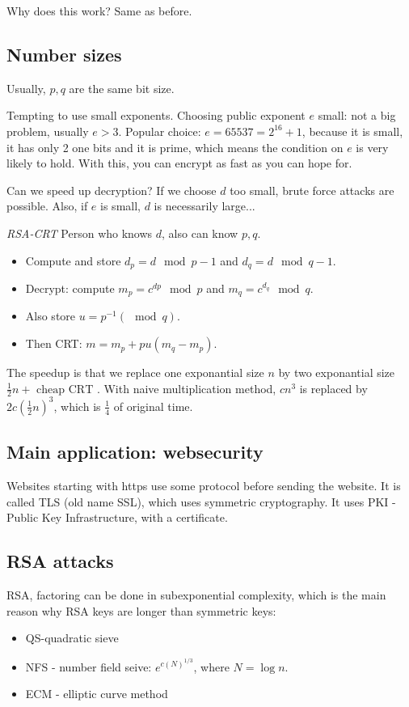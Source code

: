 \documentclass[language=english,number=]{homework}
\begin{document}
    Why does this work?
    Same as before.

    \subsection{Number sizes}

    Usually, $p,q$ are the same bit size.

    Tempting to use small exponents.
    Choosing public exponent $e$ small: not a big problem, usually $e > 3$.
    Popular choice: $e = 65537 = 2^{16} + 1$, because it is small, it has only 2 one bits and it is prime, which means the condition on $e$ is very likely to hold.
    With this, you can encrypt as fast as you can hope for.

    Can we speed up decryption?
    If we choose $d$ too small, brute force attacks are possible.
    Also, if $e$ is small, $d$ is necessarily large...

    \textit{RSA-CRT} Person who knows $d$, also can know $p,q$.
    \begin{itemize}
        \item Compute and store $d_p = d \mod p-1$ and $d_q = d \mod q-1$.
        \item Decrypt: compute $m_p = c^{dp} \mod p$ and $m_q = c^{d_q} \mod q$.
        \item Also store $u = p^{-1}(\mod q)$.
        \item Then CRT: $m = m_p + pu (m_q - m_p)$.
    \end{itemize}
    The speedup is that we replace one exponantial size $n$ by two exponantial size $\frac{1}{2}n + \text{ cheap CRT }$.
    With naive multiplication method, $c n^3$ is replaced by $2c(\frac{1}{2} n)^3$, which is $\frac{1}{4}$ of original time.

    \subsection{Main application: websecurity}

    Websites starting with https use some protocol before sending the website.
    It is called TLS (old name SSL), which uses symmetric cryptography.
    It uses PKI - Public Key Infrastructure, with a certificate.

    \subsection{RSA attacks}

    RSA, factoring can be done in subexponential complexity, which is the main reason why RSA keys are longer than symmetric keys:
    \begin{itemize}
        \item QS-quadratic sieve
        \item NFS - number field seive: $e^{c(N)^{1/3}}$, where $N = \log n$.
        \item ECM - elliptic curve method
    \end{itemize}
\end{document}
